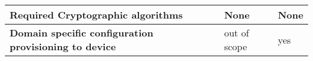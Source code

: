 \begin{landscape}
\begin{longtable}{|p{5cm}|l|l|}
		\hline
		\rowcolor[rgb]{ .745,  .804,  .843} \textbf{Required Cryptographic algorithms } & \multicolumn{1}{p{18.335em}|}{\cellcolor[rgb]{ 1,  1,  1}None} & \multicolumn{1}{p{18.335em}|}{\cellcolor[rgb]{ 1,  1,  1}None} \bigstrut\\

		\hline
		\rowcolor[rgb]{ .745,  .804,  .843} \textbf{Domain specific configuration provisioning to device} & \cellcolor[rgb]{ 1,  1,  1}out of scope & \cellcolor[rgb]{ 1,  1,  1}yes \bigstrut\\

		\hline

\end{longtable}
\end{landscape}